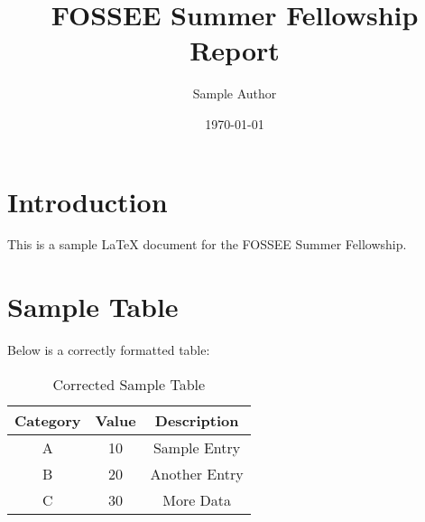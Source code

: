 \documentclass[a4paper,12pt]{article}
\begin{document}
\title{FOSSEE Summer Fellowship Report}
\author{Sample Author}
\date{\today}
\maketitle

\section{Introduction}
This is a sample LaTeX document for the FOSSEE Summer Fellowship.

\section{Sample Table}
Below is a correctly formatted table:

\begin{table}[h]
    \centering
    \begin{tabular}{|c|c|c|}
        \hline
        \textbf{Category} & \textbf{Value} & \textbf{Description} \\
        \hline
        A & 10 & Sample Entry \\
        B & 20 & Another Entry \\
        C & 30 & More Data \\
        \hline
    \end{tabular}
    \caption{Corrected Sample Table}
    \label{tab:sample}
\end{table}
\end{document}
